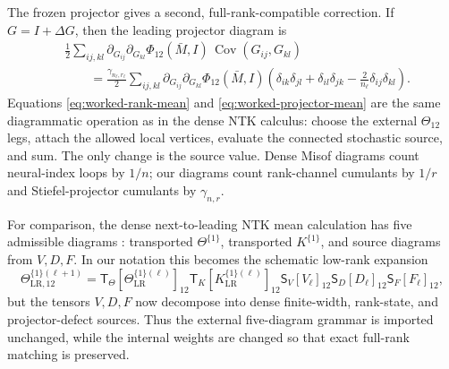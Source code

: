 \documentclass{article}
\newcommand{\Cov}{\operatorname{Cov}}
\begin{document}
The frozen projector gives a second, full-rank-compatible correction. If \(G=I+\Delta G\), then the leading projector diagram is
\begin{equation}
\begin{aligned}
&\frac12
\sum_{ij,kl}
\partial_{G_{ij}}\partial_{G_{kl}}\Phi_{12}(\bar M,I)\,
\Cov(G_{ij},G_{kl})\\
&\qquad =
\frac{\gamma_{n_\ell,r_\ell}}2
\sum_{ij,kl}
\partial_{G_{ij}}\partial_{G_{kl}}\Phi_{12}(\bar M,I)
\left(\delta_{ik}\delta_{jl}+\delta_{il}\delta_{jk}
-\frac2{n_\ell}\delta_{ij}\delta_{kl}\right).
\end{aligned}
\label{eq:worked-projector-mean}
\end{equation}
Equations \eqref{eq:worked-rank-mean} and \eqref{eq:worked-projector-mean} are the same diagrammatic operation as in the dense NTK calculus: choose the external \(\Theta_{12}\) legs, attach the allowed local vertices, evaluate the connected stochastic source, and sum. The only change is the source value. Dense Misof diagrams count neural-index loops by \(1/n\); our diagrams count rank-channel cumulants by \(1/r\) and Stiefel-projector cumulants by \(\gamma_{n,r}\).

For comparison, the dense next-to-leading NTK mean calculation has five admissible diagrams \citep{FeynmanNTK2025}: transported \(\Theta^{\{1\}}\), transported \(K^{\{1\}}\), and source diagrams from \(V,D,F\). In our notation this becomes the schematic low-rank expansion
\begin{equation}
\Theta^{\{1\}(\ell+1)}_{\mathrm{LR},12}
=
\mathsf T_\Theta[\Theta^{\{1\}(\ell)}_{\mathrm{LR}}]_{12}
\mathsf T_K[K^{\{1\}(\ell)}_{\mathrm{LR}}]_{12}
\mathsf S_V[V_\ell]_{12}
\mathsf S_D[D_\ell]_{12}
\mathsf S_F[F_\ell]_{12},
\label{eq:worked-lowrank-ntk-mean}
\end{equation}
but the tensors \(V,D,F\) now decompose into dense finite-width, rank-state, and projector-defect sources. Thus the external five-diagram grammar is imported unchanged, while the internal weights are changed so that exact full-rank matching is preserved.
\end{document}
